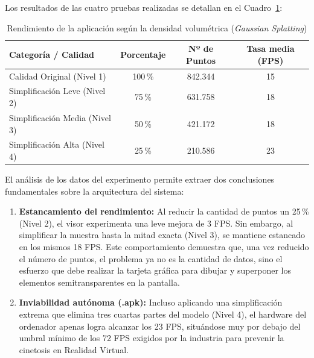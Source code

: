 Los resultados de las cuatro pruebas realizadas se detallan en el Cuadro~\ref{tab:fps_splatting}:

\begin{table}[!htb]
    \centering
    \caption{Rendimiento de la aplicación según la densidad volumétrica (\textit{Gaussian Splatting})}
    \label{tab:fps_splatting}
    \begin{tabular}{lccc}
        \toprule
        \textbf{Categoría / Calidad} & \textbf{Porcentaje} & \textbf{Nº de Puntos} & \textbf{Tasa media (FPS)} \\
        \midrule
        Calidad Original (Nivel 1) & 100\,\% & 842.344 & 15 \\
        Simplificación Leve (Nivel 2) & 75\,\% & 631.758 & 18 \\
        Simplificación Media (Nivel 3) & 50\,\% & 421.172 & 18 \\
        Simplificación Alta (Nivel 4) & 25\,\% & 210.586 & 23 \\
        \bottomrule
    \end{tabular}
\end{table}

El análisis de los datos del experimento permite extraer dos conclusiones fundamentales sobre la arquitectura del sistema:

\begin{enumerate}
    \item \textbf{Estancamiento del rendimiento:} Al reducir la cantidad de puntos un 25\,\% (Nivel 2), el visor experimenta una leve mejora de 3 FPS. Sin embargo, al simplificar la muestra hasta la mitad exacta (Nivel 3), se mantiene estancado en los mismos 18 FPS. Este comportamiento demuestra que, una vez reducido el número de puntos, el problema ya no es la cantidad de datos, sino el esfuerzo que debe realizar la tarjeta gráfica para dibujar y superponer los elementos semitransparentes en la pantalla.
    \item \textbf{Inviabilidad autónoma (.apk):} Incluso aplicando una simplificación extrema que elimina tres cuartas partes del modelo (Nivel 4), el hardware del ordenador apenas logra alcanzar los 23 FPS, situándose muy por debajo del umbral mínimo de los 72 FPS exigidos por la industria para prevenir la cinetosis en Realidad Virtual.
\end{enumerate}

